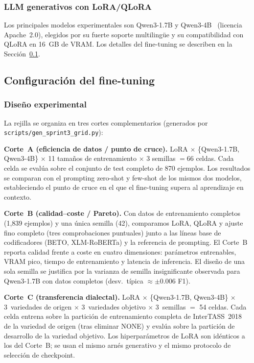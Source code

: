 \documentclass[conference]{IEEEtran}
\begin{document}
\subsubsection*{LLM generativos con LoRA/QLoRA}
Los principales modelos experimentales son Qwen3-1.7B y
Qwen3-4B~\cite{qwen3technicalreport2025} (licencia Apache~2.0), elegidos por su
fuerte soporte multilingüe y su compatibilidad con QLoRA en 16~GB de VRAM.
Los detalles del fine-tuning se describen en la
Sección~\ref{sec:methodology_setup}.

\subsection{Configuración del fine-tuning}
\label{sec:methodology_setup}

\subsubsection*{Diseño experimental}

La rejilla se organiza en tres cortes complementarios
(generados por \texttt{scripts/gen\_sprint3\_grid.py}):

\textbf{Corte~A (eficiencia de datos / punto de cruce).}
LoRA $\times$ \{Qwen3-1.7B, Qwen3-4B\} $\times$ 11 tamaños de entrenamiento
$\times$ 3 semillas $= 66$ celdas.
Cada celda se evalúa sobre el conjunto de test completo de 870 ejemplos.
Los resultados se comparan con el prompting zero-shot y few-shot de los mismos
dos modelos, estableciendo el punto de cruce en el que el fine-tuning supera al
aprendizaje en contexto.

\textbf{Corte~B (calidad--coste / Pareto).}
Con datos de entrenamiento completos (1,839 ejemplos) y una única semilla (42),
comparamos LoRA, QLoRA y ajuste fino completo (tres comprobaciones puntuales)
junto a las líneas base de codificadores (BETO, XLM-RoBERTa) y la referencia de
prompting.
El Corte~B reporta calidad frente a coste en cuatro dimensiones: parámetros
entrenables, VRAM pico, tiempo de entrenamiento y latencia de inferencia.
El diseño de una sola semilla se justifica por la varianza de semilla
insignificante observada para Qwen3-1.7B con datos completos
(desv.\ típica $\approx \pm0.006$ F1).

\textbf{Corte~C (transferencia dialectal).}
LoRA $\times$ \{Qwen3-1.7B, Qwen3-4B\} $\times$ 3~variedades de origen $\times$
3~variedades objetivo $\times$ 3~semillas $=$ 54 celdas.
Cada celda entrena sobre la partición de entrenamiento completa de
InterTASS~2018 de la variedad de origen (tras eliminar NONE) y evalúa sobre la
partición de desarrollo de la variedad objetivo.
Los hiperparámetros de LoRA son idénticos a los del Corte~B; se usan el mismo
arnés generativo y el mismo protocolo de selección de checkpoint.
\end{document}
